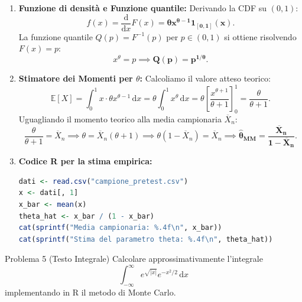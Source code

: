 \documentclass[11pt,a4paper]{article}
\newcommand{\EE}{\mathbb{E}}
\newcommand{\dx}{\mathrm{d}x}
\begin{document}
\begin{soluzionebox}
\begin{enumerate}
    \item \textbf{Funzione di densità e Funzione quantile:}
    Derivando la CDF su $(0, 1)$:
    \[
    f(x) = \frac{\mathrm{d}}{\dx} F(x) = \mathbf{\theta x^{\theta-1} \mathbf{1}_{[0, 1]}(x)}.
    \]
    La funzione quantile $Q(p) = F^{-1}(p)$ per $p \in (0, 1)$ si ottiene risolvendo $F(x) = p$:
    \[
    x^\theta = p \implies \mathbf{Q(p) = p^{1/\theta}}.
    \]

    \item \textbf{Stimatore dei Momenti per $\theta$:}
    Calcoliamo il valore atteso teorico:
    \[
    \EE[X] = \int_0^1 x \cdot \theta x^{\theta-1} \, \dx = \theta \int_0^1 x^\theta \, \dx = \theta \left[ \frac{x^{\theta+1}}{\theta+1} \right]_0^1 = \frac{\theta}{\theta+1}.
    \]
    Uguagliando il momento teorico alla media campionaria $\overline{X}_n$:
    \[
    \frac{\theta}{\theta+1} = \overline{X}_n \implies \theta = \overline{X}_n(\theta + 1) \implies \theta(1 - \overline{X}_n) = \overline{X}_n \implies \mathbf{\widehat{\theta}_{\text{MM}} = \frac{\overline{X}_n}{1 - \overline{X}_n}}.
    \]

    \item \textbf{Codice R per la stima empirica:}
\begin{lstlisting}[language=R]
dati <- read.csv("campione_pretest.csv")
x <- dati[, 1]
x_bar <- mean(x)
theta_hat <- x_bar / (1 - x_bar)
cat(sprintf("Media campionaria: %.4f\n", x_bar))
cat(sprintf("Stima del parametro theta: %.4f\n", theta_hat))
\end{lstlisting}
\end{enumerate}
\end{soluzionebox}

\begin{problemabox}{Problema 5 (Testo Integrale)}
Calcolare approssimativamente l'integrale
\[
\int_{-\infty}^\infty e^{\sqrt{|x|}} e^{-x^2/2} \, \dx
\]
implementando in R il metodo di Monte Carlo.
\end{problemabox}
\end{document}
